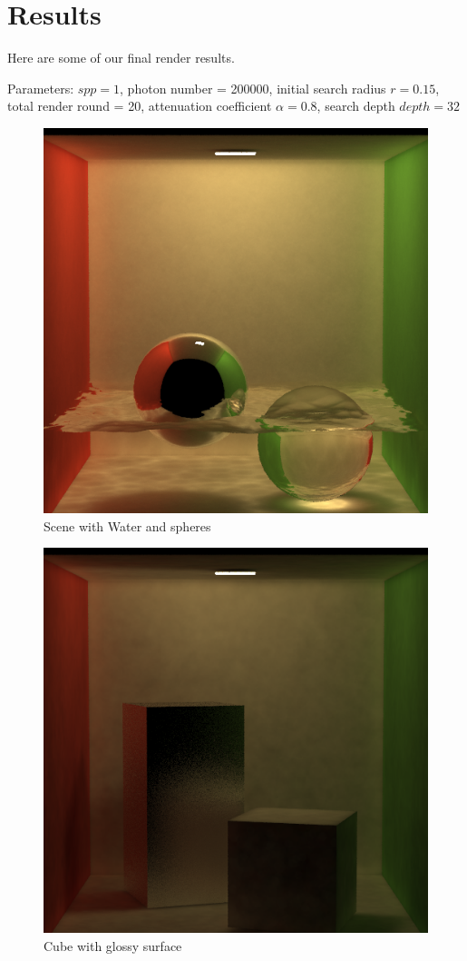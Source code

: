 \documentclass[acmtog]{acmart}
\begin{document}
\section{Results}
Here are some of our final render results.

Parameters: $spp = 1$, photon number = 200000, initial search radius $r = 0.15$, total render round = 20, attenuation coefficient $\alpha = 0.8$,
search depth $depth = 32$
\begin{figure}[h]
	\centering
	\includegraphics[scale=0.3]{Images/Water_round20_photon200000_r0.15_alpha0.8/output_water.png}
	\caption{Scene with Water and spheres}
	\end{figure}
\begin{figure}[h]
		\centering
		\includegraphics[scale=0.3]{Images/glossy.png}
		\caption{Cube with glossy surface}
	\end{figure}
\end{document}
